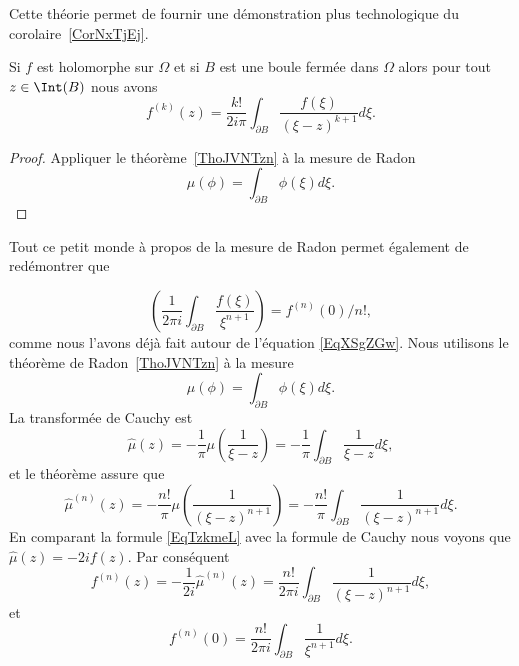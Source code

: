 Cette théorie permet de fournir une démonstration plus technologique du corolaire~\ref{CorNxTjEj}.
\begin{lemma}
	Si \( f\) est holomorphe sur \( \Omega\) et si \( B\) est une boule fermée dans \( \Omega\) alors pour tout \( z\in \Int(B)\) nous avons
	\begin{equation}
		f^{(k)}(z)=\frac{ k! }{ 2i\pi }\int_{\partial B}\frac{ f(\xi) }{ (\xi-z)^{k+1} }d\xi.
	\end{equation}
\end{lemma}

\begin{proof}
	Appliquer le théorème~\ref{ThoJVNTzn} à la mesure de Radon
	\begin{equation}
		\mu(\phi)=\int_{\partial B}\phi(\xi)d\xi.
	\end{equation}
\end{proof}

Tout ce petit monde à propos de la mesure de Radon permet également de redémontrer que

\begin{equation}
	\left( \frac{1}{ 2\pi i }\int_{\partial B}\frac{ f(\xi) }{ \xi^{n+1} } \right)=f^{(n)}(0)/n!,
\end{equation}
comme nous l'avons déjà fait autour de l'équation \eqref{EqXSgZGw}. Nous utilisons le théorème de Radon~\ref{ThoJVNTzn} à la mesure
\begin{equation}
	\mu(\phi)=\int_{\partial B}\phi(\xi)d\xi.
\end{equation}
La transformée de Cauchy est
\begin{equation}        \label{EqTzkmeL}
	\hat \mu(z)=-\frac{1}{ \pi }\mu\left( \frac{1}{ \xi-z } \right)=-\frac{1}{ \pi }\int_{\partial B}\frac{1}{ \xi-z }d\xi,
\end{equation}
et le théorème assure que
\begin{equation}
	\hat\mu^{(n)}(z)=-\frac{ n! }{ \pi }\mu\left( \frac{1}{ (\xi-z)^{n+1} } \right)=-\frac{ n! }{ \pi }\int_{\partial B}\frac{ 1 }{ (\xi-z)^{n+1} }d\xi.
\end{equation}
En comparant la formule \eqref{EqTzkmeL} avec la formule de Cauchy nous voyons que \( \hat\mu(z)=-2i f(z)\). Par conséquent
\begin{equation}
	f^{(n)}(z)=-\frac{1}{ 2i }\hat\mu^{(n)}(z)=\frac{ n! }{ 2\pi i }\int_{\partial B}\frac{1}{ (\xi-z)^{n+1} }d\xi,
\end{equation}
et
\begin{equation}
	f^{(n)}(0)=\frac{ n! }{ 2\pi i }\int_{\partial B}\frac{1}{ \xi^{n+1} }d\xi.
\end{equation}

